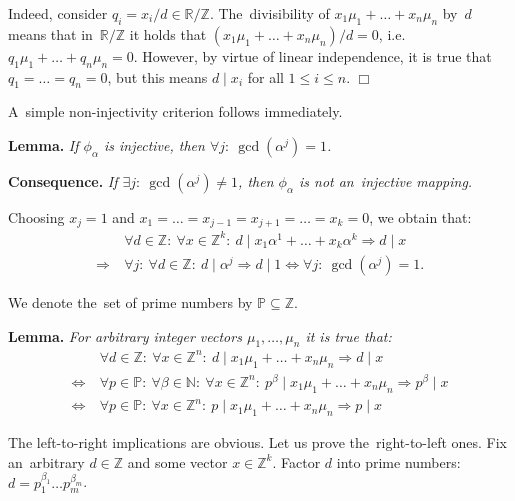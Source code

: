 \documentclass[twoside]{article}
\begin{document}
    Indeed, consider $q_i = x_i / d \in \mathbb{R} / \mathbb{Z}$. The~divisibility of $x_1 \mu_1 + \ldots + x_n \mu_n$ by~$d$ means
    that in~$\mathbb{R} / \mathbb{Z}$ it holds that $(x_1 \mu_1 + \ldots + x_n \mu_n) / d = 0$, i.e. $q_1 \mu_1 + \ldots + q_n \mu_n = 0$.
    However, by virtue of linear independence, it is true that $q_1 = \ldots = q_n = 0$, but this means $d \mid x_i$ for all $1 \leq i \leq n$.
\hfill$\Box$\medskip

A~simple non-injectivity criterion follows immediately.

\medskip\noindent\textbf{Lemma.}\emph{
    If $\phi_\alpha$ is injective, then $\forall j{:}\ \gcd(\alpha^j) = 1$.
}

\medskip\noindent\textbf{Consequence.}\emph{
    If $\exists j{:}\ \gcd(\alpha^j) \neq 1$, then $\phi_\alpha$ is not an~injective mapping.
}\medskip

    Choosing $x_j = 1$ and $x_1 = \ldots = x_{j - 1} = x_{j + 1} = \ldots = x_k = 0$, we obtain that:
    \begin{align*}
                         & \forall d \in \mathbb{Z}{:}\ \forall x \in \mathbb{Z}^k{:}\ d \mid x_1 \alpha^1 + \ldots + x_k \alpha^k \Rightarrow d \mid x \\
            \Rightarrow\ & \forall j{:}\ \forall d \in \mathbb{Z}{:}\ d \mid \alpha^j \Rightarrow d \mid 1
        \Leftrightarrow \forall j{:}\ \gcd(\alpha^j) = 1.
        \tag*{$\Box$}
    \end{align*}
{}

We denote the~set of prime numbers by $\mathbb{P} \subseteq \mathbb{Z}$.

\medskip\noindent\textbf{Lemma.}\emph{
    For arbitrary integer vectors $\mu_1, \ldots, \mu_n$ it is true that:
    \begin{align*}
                         & \forall d \in \mathbb{Z}{:}\ \forall x \in \mathbb{Z}^n{:}\ d \mid x_1 \mu_1 + \ldots + x_n \mu_n \Rightarrow d \mid x \\
        \Leftrightarrow\ & \forall p \in \mathbb{P}{:}\ \forall \beta \in \mathbb{N}{:}\ \forall x \in \mathbb{Z}^n{:}\ p^\beta \mid x_1 \mu_1 + \ldots + x_n \mu_n \Rightarrow p^\beta \mid x \\
        \Leftrightarrow\ & \forall p \in \mathbb{P}{:}\ \forall x \in \mathbb{Z}^n{:}\ p \mid x_1 \mu_1 + \ldots + x_n \mu_n \Rightarrow p \mid x
    \end{align*}
}

    The left-to-right implications are obvious. Let us prove the~right-to-left ones.
    Fix an~arbitrary $d \in \mathbb{Z}$ and some vector $x \in \mathbb{Z}^k$.
    Factor $d$ into prime numbers: $d = p_1^{\beta_1} \ldots p_m^{\beta_m}$.
\end{document}
